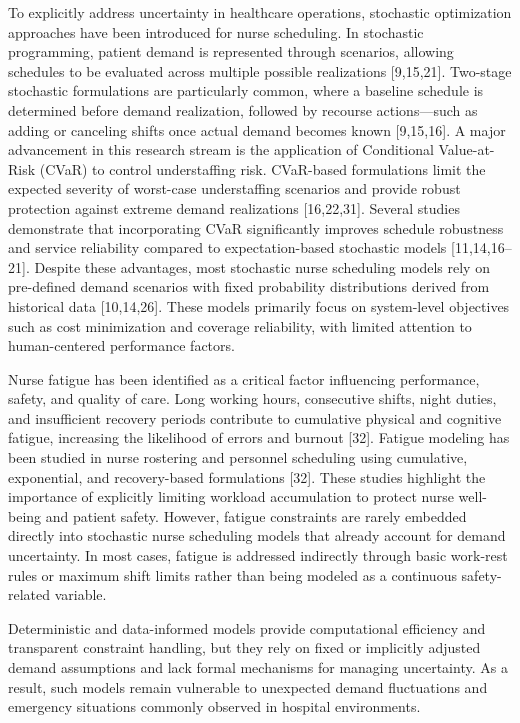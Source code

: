 \documentclass[10pt,a4paper,twocolumn]{article}
\begin{document}
To explicitly address uncertainty in healthcare operations, stochastic optimization approaches have been introduced for nurse scheduling. In stochastic programming, patient demand is represented through scenarios, allowing schedules to be evaluated across multiple possible realizations [9,15,21]. Two-stage stochastic formulations are particularly common, where a baseline schedule is determined before demand realization, followed by recourse actions—such as adding or canceling shifts once actual demand becomes known [9,15,16].
A major advancement in this research stream is the application of Conditional Value-at-Risk (CVaR) to control understaffing risk. CVaR-based formulations limit the expected severity of worst-case understaffing scenarios and provide robust protection against extreme demand realizations [16,22,31]. Several studies demonstrate that incorporating CVaR significantly improves schedule robustness and service reliability compared to expectation-based stochastic models [11,14,16–21].
Despite these advantages, most stochastic nurse scheduling models rely on pre-defined demand scenarios with fixed probability distributions derived from historical data [10,14,26]. These models primarily focus on system-level objectives such as cost minimization and coverage reliability, with limited attention to human-centered performance factors.

Nurse fatigue has been identified as a critical factor influencing performance, safety, and quality of care. Long working hours, consecutive shifts, night duties, and insufficient recovery periods contribute to cumulative physical and cognitive fatigue, increasing the likelihood of errors and burnout [32].
Fatigue modeling has been studied in nurse rostering and personnel scheduling using cumulative, exponential, and recovery-based formulations [32]. These studies highlight the importance of explicitly limiting workload accumulation to protect nurse well-being and patient safety. However, fatigue constraints are rarely embedded directly into stochastic nurse scheduling models that already account for demand uncertainty. In most cases, fatigue is addressed indirectly through basic work-rest rules or maximum shift limits rather than being modeled as a continuous safety-related variable.

Deterministic and data-informed models provide computational efficiency and transparent constraint handling, but they rely on fixed or implicitly adjusted demand assumptions and lack formal mechanisms for managing uncertainty. As a result, such models remain vulnerable to unexpected demand fluctuations and emergency situations commonly observed in hospital environments.
\end{document}

